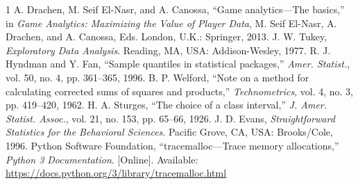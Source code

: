 \documentclass[conference]{IEEEtran}
\begin{document}
\begin{thebibliography}{1}
 A. Drachen, M. Seif El-Nasr, and A. Canossa, ``Game analytics---The basics,'' in \emph{Game Analytics: Maximizing the Value of Player Data}, M. Seif El-Nasr, A. Drachen, and A. Canossa, Eds. London, U.K.: Springer, 2013.
 J. W. Tukey, \emph{Exploratory Data Analysis}. Reading, MA, USA: Addison-Wesley, 1977.
 R. J. Hyndman and Y. Fan, ``Sample quantiles in statistical packages,'' \emph{Amer. Statist.}, vol. 50, no. 4, pp. 361--365, 1996.
 B. P. Welford, ``Note on a method for calculating corrected sums of squares and products,'' \emph{Technometrics}, vol. 4, no. 3, pp. 419--420, 1962.
 H. A. Sturges, ``The choice of a class interval,'' \emph{J. Amer. Statist. Assoc.}, vol. 21, no. 153, pp. 65--66, 1926.
 J. D. Evans, \emph{Straightforward Statistics for the Behavioral Sciences}. Pacific Grove, CA, USA: Brooks/Cole, 1996.
 Python Software Foundation, ``tracemalloc---Trace memory allocations,'' \emph{Python 3 Documentation}. [Online]. Available: \url{https://docs.python.org/3/library/tracemalloc.html}
\end{thebibliography}
\end{document}
